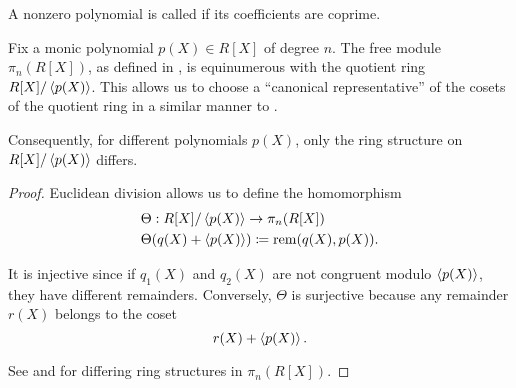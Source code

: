 \begin{definition}\label{def:primitive_polynomial}\cite[394]{Knapp2016BAlg}
  A nonzero polynomial is called  if its coefficients are coprime.
\end{definition}

\begin{proposition}\label{thm:polynomial_quotient_rings_equinumerous_with_module_of_polynomials}
  Fix a monic polynomial \( p(X) \in R[X] \) of degree \( n \). The free module \( \pi_n(R[X]) \), as defined in , is equinumerous with the quotient ring \( R[X] / \left\langle p(X) \right\rangle \). This allows us to choose a \enquote{canonical representative} of the cosets of the quotient ring in a similar manner to .

  Consequently, for different polynomials \( p(X) \), only the ring structure on \( R[X] / \left\langle p(X) \right\rangle \) differs.
\end{proposition}
\begin{proof}
  Euclidean division allows us to define the homomorphism
  \begin{align*}
    &\Theta: R[X] / \left\langle p(X) \right\rangle \to \pi_n(R[X]) \\
    &\Theta(q(X) + \left\langle p(X) \right\rangle) \coloneqq \operatorname{rem}(q(X), p(X)).
  \end{align*}

  It is injective since if \( q_1(X) \) and \( q_2(X) \) are not congruent modulo \( \left\langle p(X) \right\rangle \), they have different remainders. Conversely, \( \Theta \) is surjective because any remainder \( r(X) \) belongs to the coset
  \begin{equation*}
    r(X) + \left\langle p(X) \right\rangle.
  \end{equation*}

  See  and  for differing ring structures in \( \pi_n(R[X]) \).
\end{proof}

